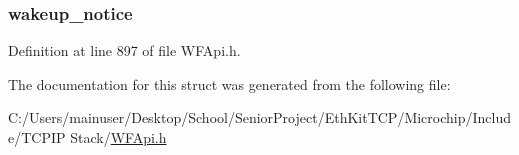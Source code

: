 \subsubsection[{wakeup\+\_\+notice}]{ wakeup\+\_\+notice}\label{struct_w_f_hibernate_af05425a7593f60edaa1ec4e95d77628a}


Definition at line 897 of file W\+F\+Api.\+h.



The documentation for this struct was generated from the following file\+:\begin{DoxyCompactItemize}
\item 
C\+:/\+Users/mainuser/\+Desktop/\+School/\+Senior\+Project/\+Eth\+Kit\+T\+C\+P/\+Microchip/\+Include/\+T\+C\+P\+I\+P Stack/\hyperlink{_w_f_api_8h}{W\+F\+Api.\+h}\end{DoxyCompactItemize}
